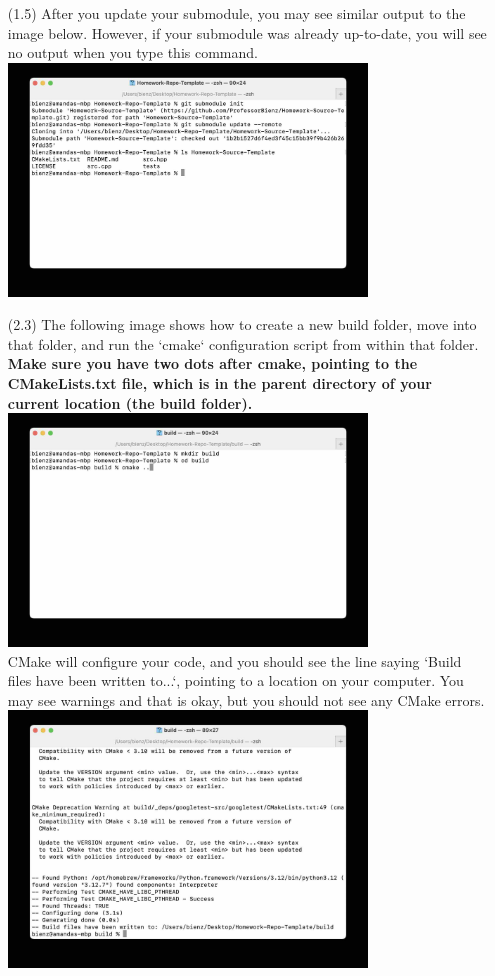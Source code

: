 \documentclass{article} %
\begin{document}
\begin{enumerate}
    \item [(1.5)] After you update your submodule, you may see similar output to the image below.  However, if your submodule was already up-to-date, you will see no output when you type this command.\\
    \includegraphics[width=0.75\textwidth]{figs/4_submodule.jpg}

    \item [(2.3)] The following image shows how to create a new build folder, move into that folder, and run the `cmake` configuration script from within that folder.  \textbf{Make sure you have two dots after cmake, pointing to the CMakeLists.txt file, which is in the parent directory of your current location (the build folder).}\\
    \includegraphics[width=0.75\textwidth]{figs/5_configure.jpg}\\
    CMake will configure your code, and you should see the line saying `Build files have been written to...`, pointing to a location on your computer.  You may see warnings and that is okay, but you should not see any CMake errors.\\
    \includegraphics[width=0.75\textwidth]{figs/6_configure.jpg}


\end{enumerate}
\end{document}

